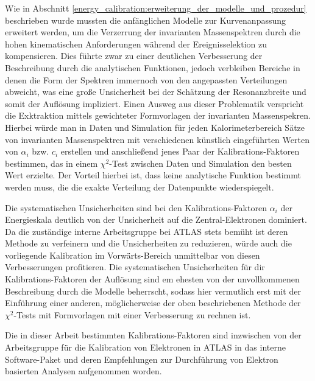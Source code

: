 Wie in Abschnitt \ref{energy_calibration:erweiterung_der_modelle_und_prozedur}
beschrieben wurde mussten die anfänglichen Modelle zur Kurvenanpassung
erweitert werden, um die Verzerrung der invarianten Massenspektren durch die
hohen kinematischen Anforderungen während der Ereignisselektion zu
kompensieren.  Dies führte zwar zu einer deutlichen Verbesserung der
Beschreibung durch die analytischen Funktionen, jedoch verbleiben Bereiche in
denen die Form der Spektren immernoch von den angepassten Verteilungen
abweicht, was eine große Unsicherheit bei der Schätzung der Resonanzbreite und
somit der Auflösung impliziert. Einen Ausweg aus dieser Problematik verspricht
die Exktraktion mittels gewichteter Formvorlagen der invarianten Massenspekren.
Hierbei würde man in Daten und Simulation für jeden Kalorimeterbereich Sätze
von invarianten Massenspektren mit verschiedenen künstlich eingeführten Werten
von $\alpha_i$ bzw. $c_i$ erstellen und anschließend jenes Paar der
Kalibrations-Faktoren bestimmen, das in einem $\chi^2$-Test zwischen Daten
und Simulation den besten Wert erzielte. Der Vorteil hierbei ist, dass keine
analytische Funktion bestimmt werden muss, die die exakte Verteilung der
Datenpunkte wiederspiegelt.

Die systematischen Unsicherheiten sind bei den Kalibrations-Faktoren $\alpha_i$
der Energieskala deutlich von der Unsicherheit auf die Zentral-Elektronen
dominiert. Da die zuständige interne Arbeitsgruppe bei ATLAS stets bemüht ist
deren Methode zu verfeinern und die Unsicherheiten zu reduzieren, würde
auch die vorliegende Kalibration im Vorwärts-Bereich unmittelbar von diesen
Verbesserungen profitieren. Die systematischen Unsicherheiten für dir
Kalibrations-Faktoren der Auflösung sind em ehesten von der unvollkommenen
Beschreibung durch die Modelle beherrscht, sodass hier vermutlich erst mit der
Einführung einer anderen, möglicherweise der oben beschriebenen Methode der
$\chi^2$-Tests mit Formvorlagen mit einer Verbesserung zu rechnen ist.

Die in dieser Arbeit bestimmten Kalibrations-Faktoren sind inzwischen von der
Arbeitsgruppe für die Kalibration von Elektronen in ATLAS in das interne 
Software-Paket und deren Empfehlungen zur Durchführung von Elektron basierten
Analysen aufgenommen worden.

